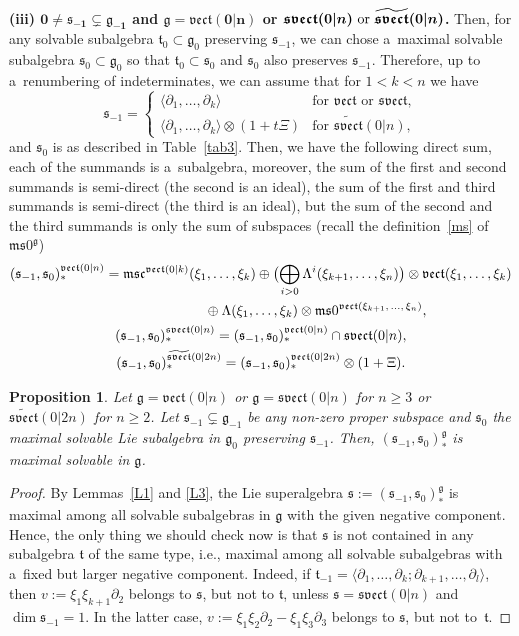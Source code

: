 \documentclass[pdftex]{sigma}
\newcommand{\del}{\partial}
\newcommand {\fc} {{\mathfrak{c}}}
\newcommand {\fg} {{\mathfrak{g}}} %
\newcommand {\fm} {{\mathfrak{m}}}
\newcommand {\fs} {{\mathfrak{s}}}
\newcommand {\fsvect} {{\mathfrak{svect}}}
\newcommand {\ft} {{\mathfrak{t}}}
\newcommand {\fvect} {{\mathfrak{vect}}} %
\newcommand {\<} [2] {{\left.\vphantom{#2}\right.^{#1\!}\!{#2}}}
\numberwithin{equation}{section}
\newtheorem{Proposition}[Theorem]{Proposition}
\begin{document}
{\bf (iii) $\boldsymbol{0\neq\fs_{-1}\subsetneq\fg_{-1}}$ and $\boldsymbol{\fg=\fvect(0|n)}$ or $\boldsymbol{\fsvect(0|n)$ or $\widetilde\fsvect(0|n)}$.}
Then, for any solvable subalgebra $\ft_0\subset \fg_0$ preserving $\fs_{-1}$, we can chose a~maximal solvable subalgebra $\fs_0\subset \fg_0$ so that $\ft_0\subset \fs_0$ and $\fs_0$ also preserves $\fs_{-1}$. Therefore, up to a~renumbering of indeterminates, we can assume that for $1<k<n$ we have
\[
\fs_{-1}=\begin{cases}\langle \del_1,\dots, \del_k\rangle&\text{for $\fvect$ or $\fsvect$,}\\
\langle \del_1,\dots, \del_k\rangle\otimes (1+t\Xi)&\text{for $\widetilde\fsvect(0|n)$},
\end{cases}
\]
and $\fs_0$ is as described in Table~\ref{tab3}. Then, we have the following direct sum, each of the summands is a~subalgebra, moreover, the sum of the first and second summands is semi-direct (the second is an ideal), the sum of the first and third summands is semi-direct (the third is an ideal), but the sum of the second and the third summands is only the sum of subspaces (recall the definition~\eqref{ms} of $\fm\fs0^{\fg}$)
\begin{gather}
(\fs_{-1}, \fs_{0})_*^{\fvect(0|n)}= \fm\fs\fc^{\fvect(0|k)}(\xi_1,\dots,\xi_k)\oplus \bigl(\bigoplus_{i>0} \Lambda^i(\xi_{k+1},\dots,\xi_n)\bigr)\otimes \fvect(\xi_1,\dots,\xi_k) \nonumber\\
\hphantom{(\fs_{-1}, \fs_{0})_*^{\fvect(0|n)}=}{}
\oplus\Lambda(\xi_{1},\dots,\xi_k)\otimes \fm\fs0^{\fvect(\xi_{k+1},\, \dots, \, \xi_n)},\nonumber\\
(\fs_{-1}, \fs_{0})_*^{\fsvect(0|n)}= (\fs_{-1}, \fs_{0})_*^{\fvect(0|n)}\cap\fsvect(0|n),\nonumber\\
(\fs_{-1}, \fs_{0})_*^{\widetilde\fsvect(0|2n)}= (\fs_{-1}, \fs_{0})_*^{\fvect(0|2n)}\otimes(1+\Xi)\label{(**)}.
\end{gather}

\begin{Proposition}\label{P3} Let $\fg=\fvect(0|n)$ or $\fg=\fsvect(0|n)$ for $n\geq 3$ or $\widetilde{\fsvect}(0|2n)$ for $n\geq 2$. Let $\fs_{-1}\subsetneq\fg_{-1}$ be any non-zero proper subspace and $\fs_{0}$ the maximal solvable Lie subalgebra in $\fg_0$ preserving $\fs_{-1}$. Then, $(\fs_{-1}, \fs_0)_*^\fg$ is maximal solvable in $\fg$.
\end{Proposition}

\begin{proof}
By Lemmas~\ref{L1} and \ref{L3}, the Lie superalgebra $\fs:=(\fs_{-1}, \fs_0)_*^\fg$ is maximal among all solvable subalgebras in $\fg$ with the given negative component. Hence, the only thing we should check now is that $\fs$ is not contained in any subalgebra $\ft$ of the same type, i.e., maximal among all solvable subalgebras with a~fixed but larger negative component.
Indeed, if $\ft_{-1}=\langle \del_1,\dots,\del_k; \del_{k+1},\dots,\del_{l}\rangle $, then $v:=\xi_1\xi_{k+1}\del_2$ belongs to $\fs$, but not to $\ft$, unless $\fs=\fsvect(0|n)$ and $\dim\fs_{-1}=1$. In the latter case, ${v:=\xi_1\xi_{2}\del_2-\xi_1\xi_{3}\del_3}$ belongs to $\fs$, but not to~$\ft$.
\end{proof}
\end{document}
